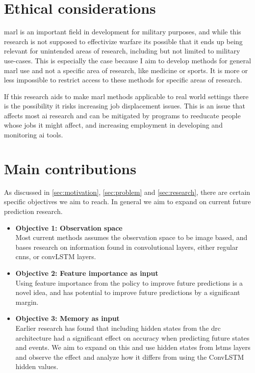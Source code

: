 \documentclass[UKenglish]{uiomasterthesis}
\begin{document}
\section{Ethical considerations}
\ac{marl} is an important field in development for military purposes\cite{military_marl}, and while this research is not supposed to effectivize warfare its possible that it ends up being relevant for unintended areas of research, including but not limited to military use-cases. This is especially the case because I aim to develop methods for general \ac{marl} use and not a specific area of research, like medicine or sports. It is more or less impossible to restrict access to these methods for specific areas of research.

If this research aids to make \ac{marl} methods applicable to real world settings there is the possibility it risks increasing job displacement issues. This is an issue that affects most \ac{ai} research and can be mitigated by programs to reeducate people whose jobs it might affect, and increasing employment in developing and monitoring \ac{ai} tools.


\section{Main contributions}
As discussed in \cref{sec:motivation}, \cref{sec:problem} and \cref{sec:research}, there are certain specific objectives we aim to reach. In general we aim to expand on current future prediction research.

\begin{itemize}

    \item \textbf{Objective 1: Observation space}\\
        Most current methods assumes the observation space to be image based, and bases research on information found in convolutional layers, either regular \acp{cnn}, or convLSTM layers.

    \item \textbf{Objective 2: Feature importance as input}\\
        Using feature importance from the policy to improve future predictions is a novel idea, and has potential to improve future predictions by a significant margin.

    \item \textbf{Objective 3: Memory as input}\\
        Earlier research has found that including hidden states from the \ac{drc} architecture had a significant effect on accuracy when predicting future states and events. We aim to expand on this and use hidden states from \acp{lstm} layers and observe the effect and analyze how it differs from using the ConvLSTM hidden values.

\end{itemize}
\end{document}
